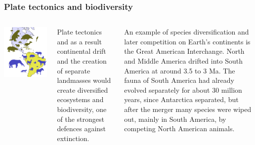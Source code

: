 \begin{frame}
\frametitle{Plate tectonics and biodiversity}

\begin{columns}

\includegraphics[scale=0.25]{tectonics}

Plate tectonics and as a result continental drift and the creation of separate landmasses would create diversified ecosystems and biodiversity, one of the strongest defences against extinction. 

An example of species diversification and later competition on Earth's continents is the Great American Interchange. North and Middle America drifted into South America at around 3.5 to 3 Ma. The fauna of South America had already evolved separately for about 30 million years, since Antarctica separated, but after the merger many species were wiped out, mainly in South America, by competing North American animals.

\end{columns}
\end{frame}


